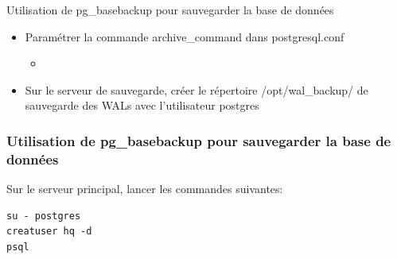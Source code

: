
\begin{frame}{Utilisation de \textsf{pg\_basebackup} pour sauvegarder la base de données}

\begin{itemize}
   \item Paramétrer la commande \textsf{archive\_command} dans postgresql.conf
   \begin{itemize}
      \item {}
   \end{itemize}

   \item Sur le serveur de sauvegarde, créer le répertoire \textsf{/opt/wal\_backup/} de sauvegarde des WALs avec l'utilisateur postgres
\end{itemize}

\end{frame}


\begin{frame}[fragile]\frametitle{Utilisation de \textsf{pg\_basebackup} pour sauvegarder la base de données}

   Sur le serveur principal, lancer les commandes suivantes:

\begin{verbatim}
su - postgres
creatuser hq -d
psql
\end{verbatim}

\begin{toile}
\end{toile}


\end{frame}


